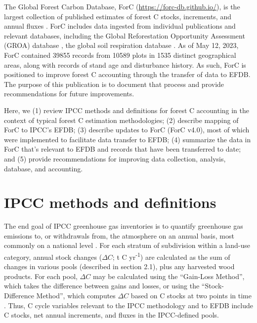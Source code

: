 \documentclass[, manuscript]{copernicus}
\begin{document}
The Global Forest Carbon Database, ForC
(\url{https://forc-db.github.io/}), is the largest collection of
published estimates of forest C stocks, increments, and annual fluxes
\citep{anderson-teixeira_forc_2018, anderson-teixeira_carbon_2021}. ForC
includes data ingested from individual publications and relevant
databases, including the Global Reforestation Opportunity Assessment
(GROA) database \citep[database doi:
10.5281/zenodo.3983644]{cook-patton_mapping_2020}, the global soil
respiration database
\citep[SRDB-V5,][]{bond-lamberty_global_2010, jian_restructured_2021}.
As of May 12, 2023, ForC contained 39855 records from 10589 plots in
1535 distinct geographical areas, along with records of stand age and
disturbance history. As such, ForC is positioned to improve forest C
accounting through the transfer of data to EFDB. The purpose of this
publication is to document that process and provide recommendations for
future improvements.

Here, we (1) review IPCC methods and definitions for forest C accounting
in the context of typical forest C estimation methodologies; (2)
describe mapping of ForC to IPCC's EFDB; (3) describe updates to ForC
(ForC v4.0), most of which were implemented to facilitate data transfer
to EFDB; (4) summarize the data in ForC that's relevant to EFDB and
records that have been transferred to date; and (5) provide
recommendations for improving data collection, analysis, database, and
accounting.

\section{IPCC methods and definitions}

The end goal of IPCC greenhouse gas inventories is to quantify
greenhouse gas emissions to, or withdrawals from, the atmosphere on an
annual basis, most commonly on a national level
\citep{ipcc_2006_2006, ipcc_2019_2019}. For each stratum of subdivision
within a land-use category, annual stock changes (\(\Delta C\); t C
yr\textsuperscript{-1}) are calculated as the sum of changes in various
pools (described in section 2.1), plus any harvested wood products. For
each pool, \(\Delta C\) may be calculated using the ``Gain-Loss
Method'', which takes the difference between gains and losses, or using
the ``Stock-Difference Method'', which computes \(\Delta C\) based on C
stocks at two points in time \citep{ipcc_2006_2006}. Thus, C cycle
variables relevant to the IPCC methodology and to EFDB include C stocks,
net annual increments, and fluxes in the IPCC-defined pools.
\end{document}
